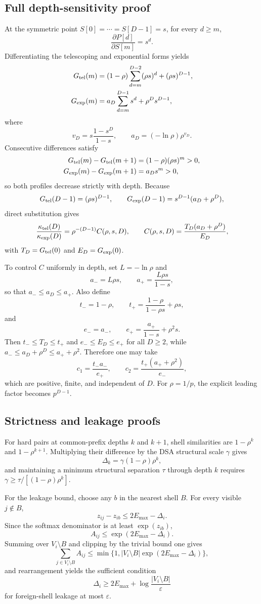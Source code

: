 \documentclass[11pt]{article}
\begin{document}
\subsection{Full depth-sensitivity proof}
At the symmetric point $S[0]=\cdots=S[D-1]=s$, for every $d\geq m$,
\[
\frac{\partial P[d]}{\partial S[m]}=s^d.
\]
Differentiating the telescoping and exponential forms yields
\begin{align}
G_{\rm tel}(m)&=(1-\rho)\sum_{d=m}^{D-2}(\rho s)^d+(\rho s)^{D-1},\\
G_{\rm exp}(m)&=a_D\sum_{d=m}^{D-1}s^d+\rho^Ds^{D-1},
\end{align}
where
\[
v_D=s\frac{1-s^D}{1-s},\qquad a_D=(-\ln\rho)\rho^{v_D}.
\]
Consecutive differences satisfy
\begin{align}
G_{\rm tel}(m)-G_{\rm tel}(m+1)&=(1-\rho)(\rho s)^m>0,\\
G_{\rm exp}(m)-G_{\rm exp}(m+1)&=a_Ds^m>0,
\end{align}
so both profiles decrease strictly with depth. Because
\[
G_{\rm tel}(D-1)=(\rho s)^{D-1},\qquad
G_{\rm exp}(D-1)=s^{D-1}(a_D+\rho^D),
\]
direct substitution gives
\[
\frac{\kappa_{\rm tel}(D)}{\kappa_{\rm exp}(D)}
=\rho^{-(D-1)}C(\rho,s,D),
\qquad
C(\rho,s,D)=\frac{T_D(a_D+\rho^D)}{E_D},
\]
with $T_D=G_{\rm tel}(0)$ and $E_D=G_{\rm exp}(0)$.

To control $C$ uniformly in depth, set $L=-\ln\rho$ and
\[
a_- = L\rho s,\qquad a_+=\frac{L\rho s}{1-s},
\]
so that $a_-\leq a_D\leq a_+$. Also define
\[
t_-=1-\rho,\qquad t_+=\frac{1-\rho}{1-\rho s}+\rho s,
\]
and
\[
e_-=a_-,\qquad e_+=\frac{a_+}{1-s}+\rho^2s.
\]
Then $t_-\leq T_D\leq t_+$ and $e_-\leq E_D\leq e_+$ for all $D\geq2$, while $a_-\leq a_D+\rho^D\leq a_++\rho^2$. Therefore one may take
\[
c_1=\frac{t_-a_-}{e_+},\qquad
c_2=\frac{t_+(a_++\rho^2)}{e_-},
\]
which are positive, finite, and independent of $D$. For $\rho=1/p$, the explicit leading factor becomes $p^{D-1}$.

\subsection{Strictness and leakage proofs}
For hard pairs at common-prefix depths $k$ and $k+1$, shell similarities are $1-\rho^k$ and $1-\rho^{k+1}$. Multiplying their difference by the DSA structural scale $\gamma$ gives
\[
\Delta_k=\gamma(1-\rho)\rho^k,
\]
and maintaining a minimum structural separation $\tau$ through depth $k$ requires $\gamma\geq\tau/[(1-\rho)\rho^k]$.

For the leakage bound, choose any $b$ in the nearest shell $B$. For every visible $j\notin B$,
\[
z_{ij}-z_{ib}\leq2E_{\max}-\Delta_i.
\]
Since the softmax denominator is at least $\exp(z_{ib})$,
\[
A_{ij}\leq\exp(2E_{\max}-\Delta_i).
\]
Summing over $V_i\setminus B$ and clipping by the trivial bound one gives
\[
\sum_{j\in V_i\setminus B}A_{ij}
\leq \min\{1,|V_i\setminus B|\exp(2E_{\max}-\Delta_i)\},
\]
and rearrangement yields the sufficient condition
\[
\Delta_i\geq2E_{\max}+\log\frac{|V_i\setminus B|}{\varepsilon}
\]
for foreign-shell leakage at most $\varepsilon$.
\end{document}
